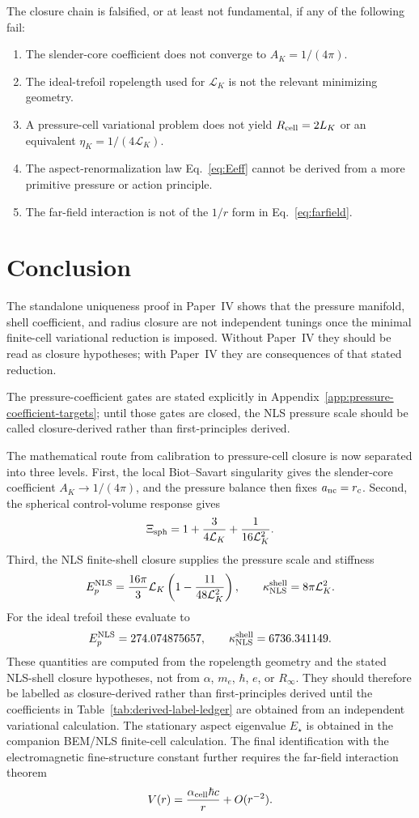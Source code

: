 \documentclass[11pt]{article}
\newcommand{\LK}{\mathcal L_K}
\newcommand{\EpNLS}{E_p^{\rm NLS}}
\newcommand{\kappaNLS}{\kappa_{\rm NLS}^{\rm shell}}
\begin{document}
The closure chain is falsified, or at least not fundamental, if any of the following fail:
\begin{enumerate}[label=(F\arabic*)]
\item The slender-core coefficient does not converge to \(A_K=1/(4\pi)\).
\item The ideal-trefoil ropelength used for \(\LK\) is not the relevant minimizing geometry.
\item A pressure-cell variational problem does not yield \(R_{\rm cell}=2L_K\) or an equivalent
      \(\eta_K=1/(4\LK)\).
\item The aspect-renormalization law Eq.~\eqref{eq:Eeff} cannot be derived from a more primitive
      pressure or action principle.
\item The far-field interaction is not of the \(1/r\) form in Eq.~\eqref{eq:farfield}.
\end{enumerate}

\section{Conclusion}


The standalone uniqueness proof in Paper~IV shows that the pressure manifold,
shell coefficient, and radius closure are not independent tunings once the
minimal finite-cell variational reduction is imposed.  Without Paper~IV they
should be read as closure hypotheses; with Paper~IV they are consequences of
that stated reduction.


The pressure-coefficient gates are stated explicitly in Appendix~\ref{app:pressure-coefficient-targets}; until those gates are closed, the NLS pressure scale should be called closure-derived rather than first-principles derived.


The mathematical route from calibration to pressure-cell closure is now separated into three
levels.  First, the local Biot--Savart singularity gives the slender-core coefficient
\(A_K\to1/(4\pi)\), and the pressure balance then fixes \(a_{\rm nc}=r_c\).  Second, the
spherical control-volume response gives
\[
  \Xi_{\rm sph}
  =
  1+\frac{3}{4\mathcal L_K}+\frac{1}{16\mathcal L_K^2}.
\]
Third, the NLS finite-shell closure supplies the pressure scale and stiffness
\[
  \EpNLS
  =
  \frac{16\pi}{3}\mathcal L_K
  \left(1-\frac{11}{48\mathcal L_K^2}\right),
  \qquad
  \kappaNLS=8\pi\mathcal L_K^2.
\]
For the ideal trefoil these evaluate to
\[
  \EpNLS=274.074875657,
  \qquad
  \kappaNLS=6736.341149.
\]
These quantities are computed from the ropelength geometry and the stated NLS-shell closure hypotheses, not from
\(\alpha\), \(m_e\), \(\hbar\), \(e\), or \(R_\infty\).  They should therefore be labelled as closure-derived rather than first-principles derived until the coefficients in Table~\ref{tab:derived-label-ledger} are obtained from an independent variational calculation.  The stationary aspect eigenvalue
\(E_\star\) is obtained in the companion BEM/NLS finite-cell calculation.  The final
identification with the electromagnetic fine-structure constant further requires the
far-field interaction theorem
\[
  V(r)=\frac{\alpha_{\rm cell}\hbar c}{r}+O(r^{-2}).
\]
\end{document}
